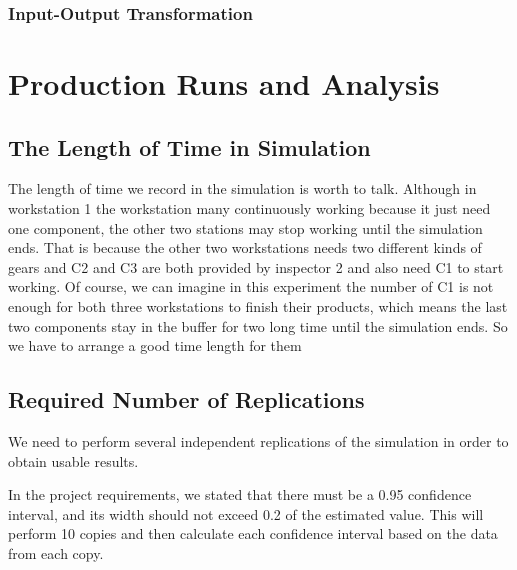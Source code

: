 \documentclass{article}
\begin{document}
\subsubsection{Input-Output Transformation}

\section{Production Runs and Analysis}
\subsection{The Length of Time in Simulation}
The length of time we record in the simulation is worth to talk. Although in workstation 1 the workstation many continuously working because it just need one component, the other two stations may stop working until the simulation ends. That is because the other two workstations needs two different kinds of gears and C2 and C3 are both provided by inspector 2 and also need C1 to start working. Of course, we can imagine in this experiment the number of C1 is not enough for both three workstations to finish their products, which means the last two components stay in the buffer for two long time until the simulation ends. So we have to arrange a good time length for them

\subsection{Required Number of Replications}
We need to perform several independent replications of the simulation in order to obtain usable results.

In the project requirements, we stated that there must be a 0.95 confidence interval, and its width should not exceed 0.2 of the estimated value. This will perform 10 copies and then calculate each confidence interval based on the data from each copy.
\end{document}
